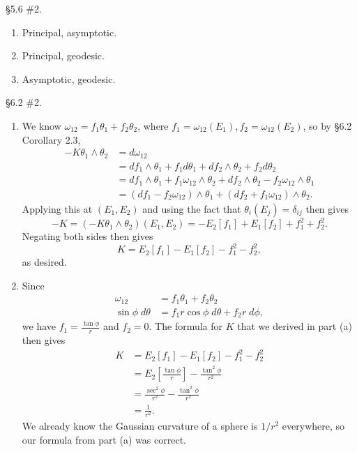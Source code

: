 \documentclass[10pt]{report}
\begin{document}

\begin{exer}[]
\S 5.6 \#2.
\end{exer}
\begin{enumerate}
	\item Principal, asymptotic.
	\item Principal, geodesic.
	\item Asymptotic, geodesic.
\end{enumerate}

\begin{exer}[]
\S 6.2 \#2.
\end{exer}
\begin{enumerate}
	\item We know $\omega_{12}=f_1\theta_1+f_2\theta_2$, where $f_1=\omega_{12}(E_1), f_2=\omega_{12}(E_2)$, so by \S 6.2 Corollary 2.3,
		\begin{align*}
			-K\theta_1\wedge\theta_2 &= d\omega_{12} \\
						 &= df_1\wedge \theta_1 + f_1d\theta_1 + df_2\wedge \theta_2 + f_2d\theta_2 \\
						 &= df_1\wedge\theta_1 + f_1\omega_{12}\wedge\theta_2+df_2\wedge\theta_2-f_2\omega_{12}\wedge\theta_1 \\
						 &= \left( df_1-f_2\omega_{12} \right)\wedge\theta_1 + \left( df_2+f_1\omega_{12} \right)\wedge \theta_2.
		\end{align*}
			 Applying this at $(E_1,E_2)$ and using the fact that $\theta_i(E_j)=\delta_{ij}$ then gives
		 \[
			-K=(-K\theta_1\wedge\theta_2)(E_1,E_2)=-E_2[f_1]+E_1[f_2]+f_1^2+f_2^2.
		\]
		Negating both sides then gives
		\[
			K=E_2[f_1]-E_1[f_2]-f_1^2-f_2^2,
		\] as desired.

	\item Since
		\begin{align*}
			\omega_{12}&=f_1\theta_1+f_2\theta_2 \\
			\sin\phi\;d\theta&=f_1r\cos\phi\;d\theta+f_2r\;d\phi,
		\end{align*}
		we have $f_1=\frac{\tan\phi}{r} $ and $f_2=0$. The formula for $K$ that we derived in part (a) then gives
		\begin{align*}
			K &= E_2[f_1]-E_1[f_2]-f_1^2-f_2^2 \\
			  &= E_2\left[ \frac{\tan\phi}{r}  \right]-\frac{\tan^2\phi}{r^2} \\
			  &= \frac{\sec^2\phi}{r^2} -\frac{\tan^2\phi}{r^2} \\
			  &= \frac{1}{r^2} .
		\end{align*}
		We already know the Gaussian curvature of a sphere is $1/r^2$ everywhere, so our formula from part (a) was correct.
\end{enumerate}
\end{document}
